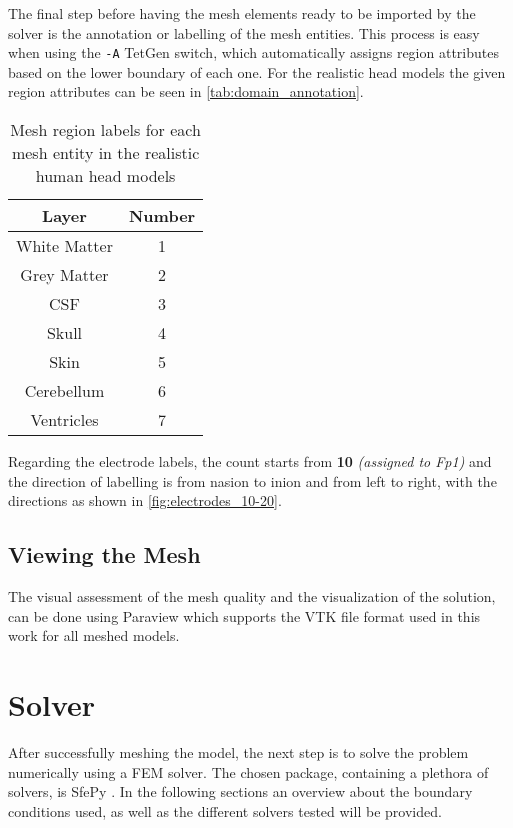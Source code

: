 The final step before having the mesh elements ready to be imported by the solver is the annotation or labelling of the mesh entities. This process is easy when using the \texttt{-A} TetGen \cite{tetgen} switch, which automatically assigns region attributes based on the lower boundary of each one. For the realistic head models the given region attributes can be seen in \autoref{tab:domain_annotation}.

\begin{table}[!ht]
	\centering
	\caption{Mesh region labels for each mesh entity in the realistic human head models}
	\label{tab:domain_annotation}
	\begin{tabular}{|c|c|}
		\hline
		\rowcolor[HTML]{C0C0C0} 
		{\color[HTML]{000000} \textbf{Layer}} & {\color[HTML]{000000} \textbf{Number}} \\ \hline
		White Matter & 1 \\ \hline
		Grey Matter & 2 \\ \hline
		\gls{CSF} & 3 \\ \hline
		Skull & 4 \\ \hline
		Skin & 5 \\ \hline
		Cerebellum & 6 \\ \hline
		Ventricles & 7 \\ \hline
	\end{tabular}
\end{table}

Regarding the electrode labels, the count starts from \textbf{10} \textit{(assigned to Fp1)} and the direction of labelling is from \gls{nasion} to \gls{inion} and from left to right, with the directions as shown in \autoref{fig:electrodes_10-20}.

\subsection{Viewing the Mesh}

The visual assessment of the mesh quality and the visualization of the solution, can be done using Paraview \cite{paraview} which supports the \gls{VTK} file format used in this work for all meshed models.

\section{Solver}
\label{sec:fem_solver}

After successfully meshing the model, the next step is to solve the problem numerically using a \gls{FEM} solver. The chosen package, containing a plethora of solvers, is SfePy \cite{Cimrman2019}. In the following sections an overview about the boundary conditions used, as well as the different solvers tested will be provided.

